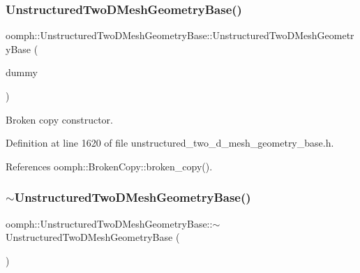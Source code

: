 \subsubsection{\texorpdfstring{Unstructured\+Two\+D\+Mesh\+Geometry\+Base()}{UnstructuredTwoDMeshGeometryBase()}\hspace{0.1cm}{\footnotesize\ttfamily [2/2]}}
{\footnotesize\ttfamily oomph\+::\+Unstructured\+Two\+D\+Mesh\+Geometry\+Base\+::\+Unstructured\+Two\+D\+Mesh\+Geometry\+Base (\begin{DoxyParamCaption}\item[{const \hyperlink{classoomph_1_1UnstructuredTwoDMeshGeometryBase}{Unstructured\+Two\+D\+Mesh\+Geometry\+Base} \&}]{dummy }\end{DoxyParamCaption})\hspace{0.3cm}{\ttfamily [inline]}}



Broken copy constructor. 



Definition at line 1620 of file unstructured\+\_\+two\+\_\+d\+\_\+mesh\+\_\+geometry\+\_\+base.\+h.



References oomph\+::\+Broken\+Copy\+::broken\+\_\+copy().

\mbox{\label{classoomph_1_1UnstructuredTwoDMeshGeometryBase_a68f77a0ca6fa3eba42b69770b06ef97a}} 
\subsubsection{\texorpdfstring{$\sim$\+Unstructured\+Two\+D\+Mesh\+Geometry\+Base()}{~UnstructuredTwoDMeshGeometryBase()}}
{\footnotesize\ttfamily oomph\+::\+Unstructured\+Two\+D\+Mesh\+Geometry\+Base\+::$\sim$\+Unstructured\+Two\+D\+Mesh\+Geometry\+Base (\begin{DoxyParamCaption}{ }\end{DoxyParamCaption})\hspace{0.3cm}{\ttfamily [inline]}}



